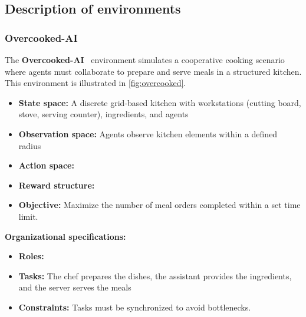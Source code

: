 \subsection{Description of environments}

\subsubsection*{Overcooked-AI}

The \textbf{Overcooked-AI}~\cite{Carroll2019} environment simulates a cooperative cooking scenario where agents must collaborate to prepare and serve meals in a structured kitchen. This environment is illustrated in \autoref{fig:overcooked}.

\begin{itemize}
  \item \textbf{State space:} A discrete grid-based kitchen with workstations (cutting board, stove, serving counter), ingredients, and agents
  \item \textbf{Observation space:} Agents observe kitchen elements within a defined radius
  \item \textbf{Action space:}
  \item \textbf{Reward structure:}
  \item \textbf{Objective:} Maximize the number of meal orders completed within a set time limit.
\end{itemize}
%
\textbf{Organizational specifications:}
\begin{itemize}
  \item \textbf{Roles:} 
  \item \textbf{Tasks:} The chef prepares the dishes, the assistant provides the ingredients, and the server serves the meals
  \item \textbf{Constraints:} Tasks must be synchronized to avoid bottlenecks.
\end{itemize}

